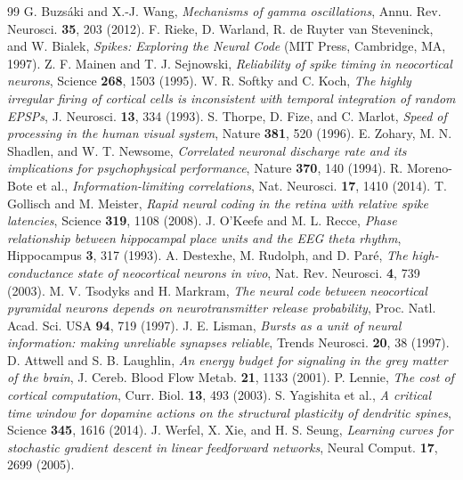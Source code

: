 \begin{thebibliography}{99}
 G. Buzs\'aki and X.-J. Wang, \emph{Mechanisms of gamma oscillations}, Annu. Rev. Neurosci. \textbf{35}, 203 (2012).
 F. Rieke, D. Warland, R. de Ruyter van Steveninck, and W. Bialek, \emph{Spikes: Exploring the Neural Code} (MIT Press, Cambridge, MA, 1997).
 Z. F. Mainen and T. J. Sejnowski, \emph{Reliability of spike timing in neocortical neurons}, Science \textbf{268}, 1503 (1995).
 W. R. Softky and C. Koch, \emph{The highly irregular firing of cortical cells is inconsistent with temporal integration of random EPSPs}, J. Neurosci. \textbf{13}, 334 (1993).
 S. Thorpe, D. Fize, and C. Marlot, \emph{Speed of processing in the human visual system}, Nature \textbf{381}, 520 (1996).
 E. Zohary, M. N. Shadlen, and W. T. Newsome, \emph{Correlated neuronal discharge rate and its implications for psychophysical performance}, Nature \textbf{370}, 140 (1994).
 R. Moreno-Bote et al., \emph{Information-limiting correlations}, Nat. Neurosci. \textbf{17}, 1410 (2014).
 T. Gollisch and M. Meister, \emph{Rapid neural coding in the retina with relative spike latencies}, Science \textbf{319}, 1108 (2008).
 J. O'Keefe and M. L. Recce, \emph{Phase relationship between hippocampal place units and the EEG theta rhythm}, Hippocampus \textbf{3}, 317 (1993).
 A. Destexhe, M. Rudolph, and D. Par\'e, \emph{The high-conductance state of neocortical neurons in vivo}, Nat. Rev. Neurosci. \textbf{4}, 739 (2003).
 M. V. Tsodyks and H. Markram, \emph{The neural code between neocortical pyramidal neurons depends on neurotransmitter release probability}, Proc. Natl. Acad. Sci. USA \textbf{94}, 719 (1997).
 J. E. Lisman, \emph{Bursts as a unit of neural information: making unreliable synapses reliable}, Trends Neurosci. \textbf{20}, 38 (1997).
 D. Attwell and S. B. Laughlin, \emph{An energy budget for signaling in the grey matter of the brain}, J. Cereb. Blood Flow Metab. \textbf{21}, 1133 (2001).
 P. Lennie, \emph{The cost of cortical computation}, Curr. Biol. \textbf{13}, 493 (2003).
 S. Yagishita et al., \emph{A critical time window for dopamine actions on the structural plasticity of dendritic spines}, Science \textbf{345}, 1616 (2014).
 J. Werfel, X. Xie, and H. S. Seung, \emph{Learning curves for stochastic gradient descent in linear feedforward networks}, Neural Comput. \textbf{17}, 2699 (2005).

\end{thebibliography}
